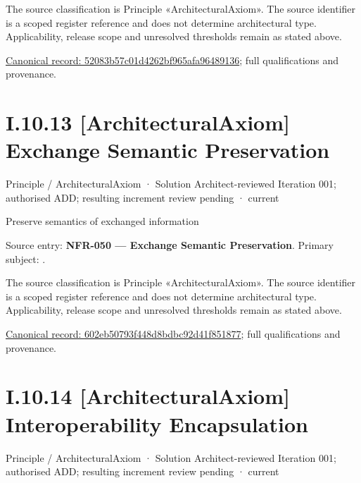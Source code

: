 The source classification is Principle «ArchitecturalAxiom». The source identifier is a scoped register reference and does not determine architectural type. Applicability, release scope and unresolved thresholds remain as stated above.


{\footnotesize \href{../../../../../../../continuum/motivation/principle/architectural-axiom/52083b57c01d4262bf965afa96489136.md}{Canonical record: 52083b57c01d4262bf965afa96489136}; full qualifications and provenance.}\par
\section*{I.10.13 [ArchitecturalAxiom] Exchange Semantic Preservation}
\label{navigation:I.10.13}

\label{element:602eb50793f448d8bdbc92d41f851877}
{\small Principle / ArchitecturalAxiom · Solution Architect-reviewed Iteration 001; authorised ADD; resulting increment review pending · current}\par

Preserve semantics of exchanged information



Source entry: \textbf{NFR-050 — Exchange Semantic Preservation}. Primary subject: \texttt{}.



The source classification is Principle «ArchitecturalAxiom». The source identifier is a scoped register reference and does not determine architectural type. Applicability, release scope and unresolved thresholds remain as stated above.


{\footnotesize \href{../../../../../../../continuum/motivation/principle/architectural-axiom/602eb50793f448d8bdbc92d41f851877.md}{Canonical record: 602eb50793f448d8bdbc92d41f851877}; full qualifications and provenance.}\par
\section*{I.10.14 [ArchitecturalAxiom] Interoperability Encapsulation}
\label{navigation:I.10.14}

\label{element:e9e0b4f82b6544e7ba87651c578d82c2}
{\small Principle / ArchitecturalAxiom · Solution Architect-reviewed Iteration 001; authorised ADD; resulting increment review pending · current}\par

